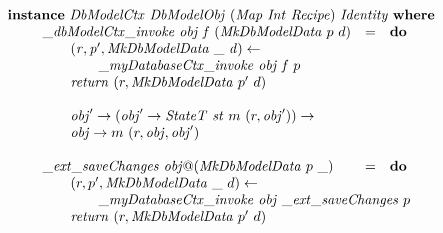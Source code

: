 \begin{displaymath}
\begin{array}{l}
\mathbf{instance}~\mathit{DbModelCtx}~\mathit{DbModelObj}~(\mathit{Map}~\mathit{Int}~\mathit{Recipe})~\mathit{Identity}~\mathbf{where}\\
\qquad \begin{array}{lcl}
\mathit{\_\mathit{dbModelCtx\_invoke}}~\mathit{obj}~\mathit{f}~(\mathit{MkDbModelData}~p~d) & = & \mathbf{do} \\
\multicolumn{3}{l}{\qquad \mathit{(r,p',\mathit{MkDbModelData}~\_~d) \leftarrow}}\\
\multicolumn{3}{l}{\qquad \qquad \mathit{\_myDatabaseCtx\_invoke}~\mathit{obj}~\mathit{f}~p} \\
\multicolumn{3}{l}{\qquad \mathit{return}~(r,\mathit{MkDbModelData}~p'~d)} \\\\
\multicolumn{3}{l}{\qquad \mathit{obj}' \to (\mathit{obj}' \to \mathit{StateT}~\mathit{st}~m~(r,\mathit{obj}')) \to} \\
\multicolumn{3}{l}{\qquad \mathit{obj} \to m~(r,\mathit{obj},\mathit{obj}')} \\\\

\mathit{\_ext\_saveChanges}~\mathit{obj}@(\mathit{MkDbModelData}~p~\_) & = & \mathbf{do} \\
\multicolumn{3}{l}{\qquad (r,p',\mathit{MkDbModelData}~\_~d) \leftarrow} \\
\multicolumn{3}{l}{\qquad \qquad \mathit{\_myDatabaseCtx\_invoke}~\mathit{obj}~\mathit{\_ext\_saveChanges}~p} \\
\multicolumn{3}{l}{\qquad \mathit{return}~(r,\mathit{MkDbModelData}~p'~d)}
\end{array}
\end{array}
\end{displaymath}
